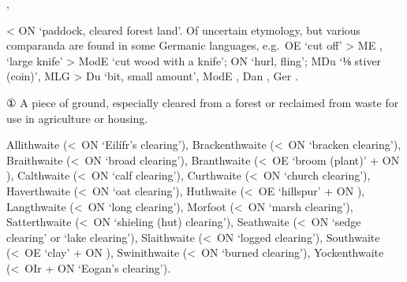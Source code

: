 \documentclass[12pt,letterpaper,oneside,article,draft]{memoir}
\begin{document}
\begin{Lemma}
\begin{Also}
	, 
\end{Also}
\begin{Etymology}
	< ON  ‘paddock, cleared forest land’.
	Of uncertain etymology, but various comparanda are found in some Germanic languages, e.g.\
		OE  ‘cut off’ > ME ,  ‘large knife’
			> ModE  ‘cut wood with a knife’;
		ON  ‘hurl, fling’;
		MDu  ‘⅛ stiver (coin)’, MLG  > Du  ‘bit, small amount’,
			ModE \fm{doit}, Dan \fm{døjt}, Ger \fm{Deut}.
\end{Etymology}
\begin{Definitions}
	① A piece of ground, especially cleared from a forest or reclaimed from waste for use in agriculture or housing.
\end{Definitions}
\begin{Examples}
Allithwaite (<~ON  ‘Eilífr’s clearing’), Brackenthwaite (<~ON  ‘bracken clearing’), Braithwaite (<~ON  ‘broad clearing’), Branthwaite (<~OE  ‘broom (plant)’ + ON ), Calthwaite (<~ON  ‘calf clearing’), Curthwaite (<~ON  ‘church clearing’), Haverthwaite (<~ON  ‘oat clearing’), Huthwaite (<~OE  ‘hillspur’ + ON ), Langthwaite (<~ON  ‘long clearing’), Morfoot (<~ON  ‘marsh clearing’), Satterthwaite (<~ON  ‘shieling (hut) clearing’), Seathwaite (<~ON  ‘sedge clearing’ or  ‘lake clearing’), Slaithwaite (<~ON  ‘logged clearing’), Southwaite (<~OE  ‘clay’ + ON ), Swinithwaite (<~ON  ‘burned clearing’), Yockenthwaite (<~OIr  + ON  ‘Eogan’s clearing’).
\end{Examples}
\end{Lemma}
\end{document}
